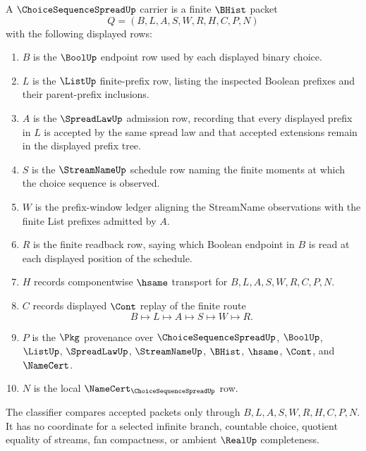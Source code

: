 \begin{definition}
\label{def:choice-sequence-spread-carrier}
A $\ChoiceSequenceSpreadUp$ carrier is a finite $\BHist$ packet
$$
Q=(B,L,A,S,W,R,H,C,P,N)
$$
with the following displayed rows:
\begin{enumerate}
\item $B$ is the $\BoolUp$ endpoint row used by each displayed binary choice.
\item $L$ is the $\ListUp$ finite-prefix row, listing the inspected Boolean
prefixes and their parent-prefix inclusions.
\item $A$ is the $\SpreadLawUp$ admission row, recording that every displayed
prefix in $L$ is accepted by the same spread law and that accepted extensions
remain in the displayed prefix tree.
\item $S$ is the $\StreamNameUp$ schedule row naming the finite moments at which
the choice sequence is observed.
\item $W$ is the prefix-window ledger aligning the StreamName observations with
the finite List prefixes admitted by $A$.
\item $R$ is the finite readback row, saying which Boolean endpoint in $B$ is
read at each displayed position of the schedule.
\item $H$ records componentwise $\hsame$ transport for
$B,L,A,S,W,R,C,P,N$.
\item $C$ records displayed $\Cont$ replay of the finite route
$$
B \longmapsto L \longmapsto A \longmapsto S \longmapsto W
\longmapsto R .
$$
\item $P$ is the $\Pkg$ provenance over $\ChoiceSequenceSpreadUp$,
$\BoolUp$, $\ListUp$, $\SpreadLawUp$, $\StreamNameUp$, $\BHist$, $\hsame$,
$\Cont$, and $\NameCert$.
\item $N$ is the local $\NameCert_{\ChoiceSequenceSpreadUp}$ row.
\end{enumerate}
The classifier compares accepted packets only through
$B,L,A,S,W,R,H,C,P,N$. It has no coordinate for a selected infinite branch,
countable choice, quotient equality of streams, fan compactness, or ambient
$\RealUp$ completeness.
\end{definition}


